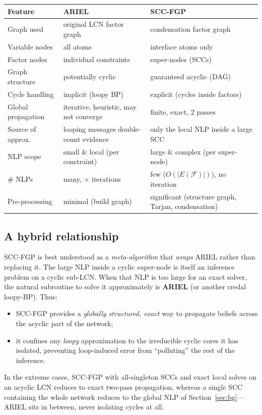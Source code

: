 \documentclass[11pt]{article}
\newcommand{\cF}{\mathcal{F}}
\begin{document}
\begin{center}
\renewcommand{\arraystretch}{1.2}
\begin{tabular}{p{3.1cm} p{5cm} p{5cm}}
\toprule
\textbf{Feature} & \textbf{ARIEL} & \textbf{SCC-FGP} \\
\midrule
Graph used & original LCN factor graph & condensation factor graph \\
Variable nodes & all atoms & interface atoms only \\
Factor nodes & individual constraints & super-nodes (SCCs) \\
Graph structure & potentially cyclic & guaranteed acyclic (DAG) \\
Cycle handling & implicit (loopy BP) & explicit (cycles inside factors) \\
Global propagation & iterative, heuristic, may not converge & finite, exact, 2 passes \\
Source of approx. & looping messages double-count evidence & only the local NLP inside a large SCC \\
NLP scope & small \& local (per constraint) & large \& complex (per super-node) \\
\# NLPs & many, $\times$ iterations & few ($O(|E(\cF)|)$), no iteration \\
Pre-processing & minimal (build graph) & significant (structure graph, Tarjan, condensation) \\
\bottomrule
\end{tabular}
\end{center}

\subsection{A hybrid relationship}

SCC-FGP is best understood as a \emph{meta-algorithm} that \emph{wraps}
ARIEL rather than replacing it. The large NLP inside a cyclic super-node is
itself an inference problem on a cyclic sub-LCN. When that NLP is too large
for an exact solver, the natural subroutine to solve it approximately is
\textbf{ARIEL} (or another credal loopy-BP). Thus:
\begin{itemize}
  \item SCC-FGP provides a \emph{globally structured, exact} way to propagate
        beliefs across the acyclic part of the network;
  \item it confines any \emph{loopy} approximation to the irreducible cyclic
        cores it has isolated, preventing loop-induced error from
        ``polluting'' the rest of the inference.
\end{itemize}
In the extreme cases, SCC-FGP with all-singleton SCCs and exact local solves
on an acyclic LCN reduces to exact two-pass propagation, whereas a single SCC
containing the whole network reduces to the global NLP of
Section~\ref{sec:bg}---ARIEL sits in between, never isolating cycles at all.
\end{document}
